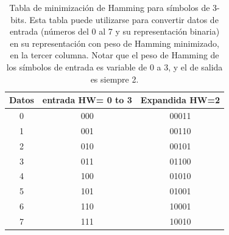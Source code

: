 \begin{table}[t]
\begin{center}
\begin{tabular}{c c c}
Datos & entrada HW= 0 to 3 & Expandida HW=2\\
\hline\hline
0 & 000 & 00011\\
1 & 001 & 00110\\
2 & 010 & 00101\\
3 & 011 & 01100\\
4 & 100 & 01010\\
5 & 101 & 01001\\
6 & 110 & 10001\\
7 & 111 & 10010\\
\end{tabular}
\caption{Tabla de minimización de Hamming para símbolos de 3-bits. Esta tabla puede utilizarse para convertir datos de entrada (números del 0 al 7 y su representación binaria) en su representación con peso de Hamming minimizado, en la tercer columna. Notar que el peso de Hamming de los símbolos de entrada es variable de 0 a 3, y el de salida es siempre 2.}
\label{hwtable}
\end{center}
 \end{table}
 
